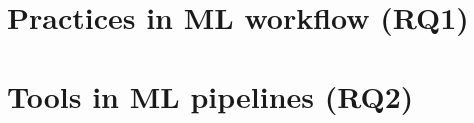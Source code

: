 




\section{\textbf{Practices in ML workflow (RQ1)}}
\label{sec:practices}








%







\section{\textbf{Tools in ML pipelines (RQ2)}}
\label{sec:tools}






\label{sec:challenges}
% 

